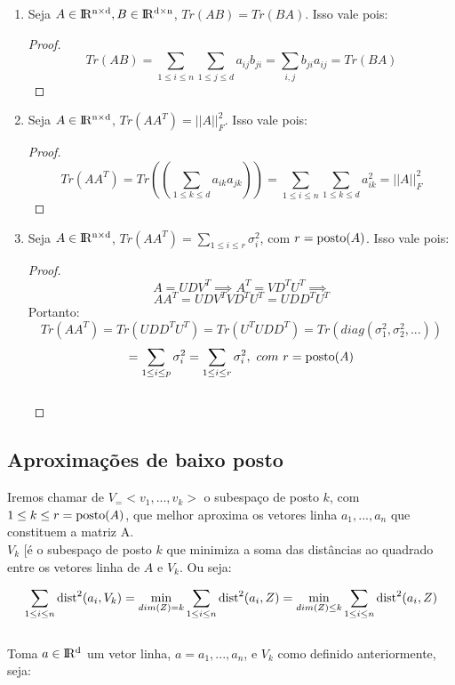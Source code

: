\begin{enumerate}
\item Seja $A \in   {\rm I\!R^{n\times d}}, B \in   {\rm I\!R^{d\times n}} $, $Tr(AB)=Tr(BA)$. Isso vale pois:
\begin{proof}
\[Tr(AB) =  \sum_{1 \leq i \leq n} \sum_{1\leq j \leq d} a_{ij}b_{ji} = \sum_{i,j} b_{ji} a_{ij} = Tr(BA)\]
\end{proof}

\item Seja $A \in  {\rm I\!R^{n\times d}} $, $ Tr(AA^T)= ||A||_F^2$. Isso vale pois:
\begin{proof}
\[ Tr(AA^T) = Tr((\sum_{1\leq k \leq d} a_{ik} a_{jk} )) = \sum_{1 \leq i \leq n} \sum_{1\leq k \leq d} a_{ik}^2 = ||A||_F^2 \]
\end{proof}

\item Seja $A \in  {\rm I\!R^{n\times d}} $, $ Tr(AA^T)= \sum_{1\leq i \leq r} \sigma_i^2$, com $r = \operatorname{posto}(A)$. Isso vale pois:
\begin{proof}
\[A = UDV^T \implies A^T = VD^T U^T \implies\]
\[AA^T = UDV^T VD^T U^T = UDD^T U^T\]
Portanto:
\[Tr(AA^T) = Tr(UDD^T U^T) = Tr(U^T UDD^T) = Tr(diag(\sigma_1^2, \sigma_2^2 , ...))\]
\[= \sum_{1\leq i \leq p} \sigma_i^2 = \sum_{1\leq i \leq r} \sigma_i^2, \ com \ r = \operatorname{posto}(A) \]\\
\end{proof}
\end{enumerate}

\subsection{Aproximações de baixo posto}

Iremos chamar de $V_ =  <v_1,...,v_k>$ o subespaço de posto $k$, com $1\leq k \leq r = \operatorname{posto}(A)$, que melhor aproxima os vetores linha $a_1, ... , a_n$ que constituem a matriz A.\\

$V_k$ [é o subespaço de posto $k$ que minimiza a soma das distâncias ao quadrado entre os vetores linha de $A$ e $V_k$. Ou seja:

\[\sum_{1\leq i \leq n} \operatorname{dist}^2(a_i,V_k) = \min_{dim(Z)=k} \sum_{1\leq i \leq n} \operatorname{dist}^2(a_i,Z) = \min_{dim(Z)\leq k} \sum_{1\leq i \leq n} \operatorname{dist}^2(a_i,Z)  \]\\

Toma $a \in {\rm I\!R^d}$ um vetor linha, $a = a_1,...,a_n$, e $V_k$ como definido anteriormente, seja:

